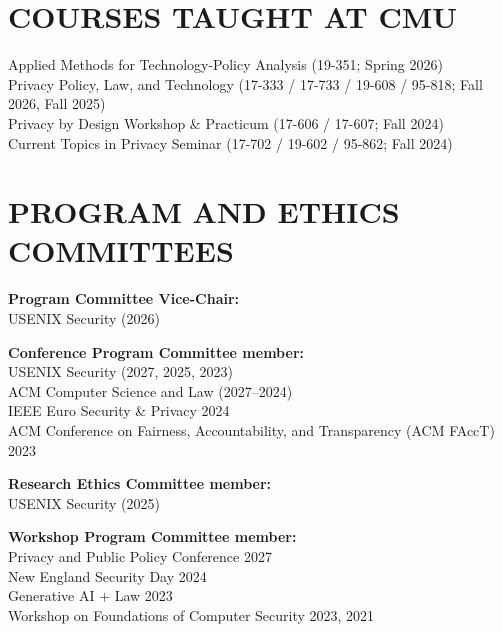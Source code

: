 \documentclass{res}
\begin{document}
\begin{resume}
\section{COURSES TAUGHT AT CMU}
Applied Methods for Technology-Policy Analysis (19-351; Spring 2026) \\
Privacy Policy, Law, and Technology (17-333 / 17-733 / 19-608 / 95-818; Fall 2026, Fall 2025) \\
Privacy by Design Workshop \& Practicum (17-606 / 17-607; Fall 2024) \\
Current Topics in Privacy Seminar (17-702 / 19-602 / 95-862; Fall 2024)



\section{PROGRAM AND ETHICS COMMITTEES}
\vspace{0.1in}

\textbf{Program Committee Vice-Chair:} \\
USENIX Security (2026) 

\textbf{Conference Program Committee member:} \\
USENIX Security (2027, 2025, 2023) \\
ACM Computer Science and Law (2027--2024) \\
IEEE Euro Security \& Privacy 2024 \\
ACM Conference on Fairness, Accountability, and Transparency (ACM FAccT) 2023

\textbf{Research Ethics Committee member:} \\
USENIX Security (2025)

\textbf{Workshop Program Committee member:} \\
Privacy and Public Policy Conference 2027 \\
New England Security Day 2024 \\
Generative AI + Law 2023 \\
Workshop on Foundations of Computer Security 2023, 2021


\end{resume}
\end{document}
